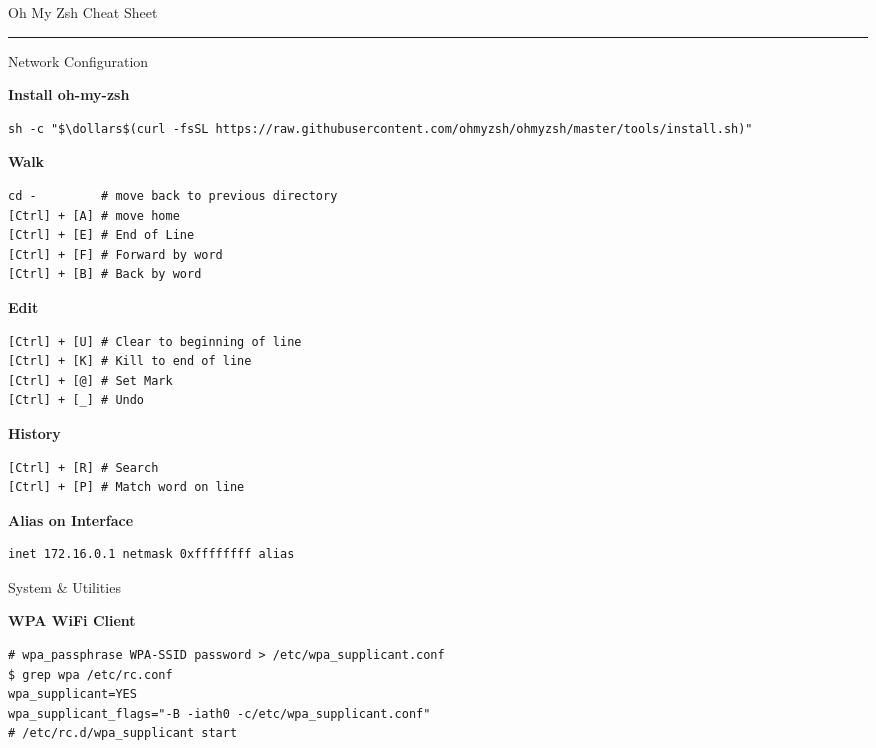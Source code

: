 \documentclass[10pt]{article}
\begin{document}
\pagestyle{empty}

{\titlefont\large \color{mygreen}Oh My Zsh Cheat Sheet}\\
\textcolor{lightgray}{\rule{\linewidth}{0.5pt}}
\vspace{0.5em}

\setlength{\columnsep}{20pt}
\begin{multicols}{2}

{\titlefont\color{blueheader}\faNetworkWired\quad Network Configuration}\vspace{5pt}

\textbf{\color{blueheader}Install oh-my-zsh}
\begin{lstlisting}
sh -c "$\dollars$(curl -fsSL https://raw.githubusercontent.com/ohmyzsh/ohmyzsh/master/tools/install.sh)"
\end{lstlisting}

  \textbf{\color{blueheader}Walk}
\begin{lstlisting}
cd -         # move back to previous directory
[Ctrl] + [A] # move home
[Ctrl] + [E] # End of Line 
[Ctrl] + [F] # Forward by word 
[Ctrl] + [B] # Back by word  
\end{lstlisting}

\textbf{\color{blueheader} Edit}
\begin{lstlisting}
[Ctrl] + [U] # Clear to beginning of line 
[Ctrl] + [K] # Kill to end of line
[Ctrl] + [@] # Set Mark
[Ctrl] + [_] # Undo
\end{lstlisting}

\textbf{\color{blueheader}History}
\begin{lstlisting}
[Ctrl] + [R] # Search 
[Ctrl] + [P] # Match word on line  
\end{lstlisting}

\textbf{\color{blueheader}Alias on Interface}
\begin{lstlisting}
inet 172.16.0.1 netmask 0xffffffff alias
\end{lstlisting}

\vfill\null\columnbreak

{\titlefont\color{blueheader}\faTools\quad System & Utilities}\vspace{5pt}

\textbf{\color{blueheader}WPA WiFi Client}
\begin{lstlisting}
# wpa_passphrase WPA-SSID password > /etc/wpa_supplicant.conf
$ grep wpa /etc/rc.conf
wpa_supplicant=YES
wpa_supplicant_flags="-B -iath0 -c/etc/wpa_supplicant.conf"
# /etc/rc.d/wpa_supplicant start
\end{lstlisting}


\end{multicols}
\end{document}
